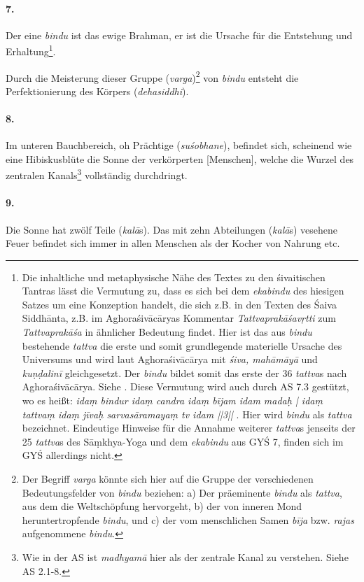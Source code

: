 \documentclass[a4paper,12pt]{article}
\begin{document}
\paragraph{7.} Der eine \textit{bindu} ist das ewige Brahman, er ist die Ursache für die Entstehung und Erhaltung\footnote{Die inhaltliche und metaphysische Nähe des Textes zu den śivaitischen Tantras lässt die Vermutung zu, dass es sich bei dem \textit{ekabindu} des hiesigen Satzes um eine Konzeption handelt, die sich z.B. in den Texten des Śaiva Siddhānta, z.B. im Aghoraśivācāryas Kommentar \textit{Tattvaprakāśavṛtti} zum \textit{Tattvaprakāśa} in ähnlicher Bedeutung findet. Hier ist das aus \textit{bindu} bestehende \textit{tattva} die erste und somit grundlegende materielle Ursache des Universums und wird laut Aghoraśivācārya mit \textit{śiva, mahāmāyā} und \textit{kuṇḍalinī} gleichgesetzt. Der \textit{bindu} bildet somit das erste der 36 \textit{tattva}s nach Aghoraśivācārya. Siehe \parencite[117, 177]{gengnagel1996}. Diese Vermutung wird auch durch AS 7.3 gestützt, wo es heißt: \textit{idaṃ bindur idaṃ candra idaṃ bījam idam madaḥ | idaṃ tattvaṃ idaṃ jīvaḥ sarvasāramayaṃ tv idam ||3||} \parencite[9]{asiddhi}. Hier wird \textit{bindu} als \textit{tattva} bezeichnet. Eindeutige Hinweise für die Annahme weiterer \textit{tattva}s jenseits der 25 \textit{tattva}s des Sāṃkhya-Yoga und dem \textit{ekabindu} aus GYŚ 7, finden sich im GYŚ allerdings nicht.}.

Durch die Meisterung dieser Gruppe (\textit{varga})\footnote{Der Begriff \textit{varga} könnte sich hier auf die Gruppe der verschiedenen Bedeutungsfelder von \textit{bindu} beziehen: a) Der präeminente \textit{bindu} als \textit{tattva}, aus dem die Weltschöpfung hervorgeht, b) der von inneren Mond heruntertropfende \textit{bindu}, und c) der vom menschlichen Samen \textit{bīja} bzw. \textit{rajas} aufgenommene \textit{bindu}.} von \textit{bindu} entsteht die Perfektionierung des Körpers (\textit{dehasiddhi}). 

\paragraph{8.} Im unteren Bauchbereich, oh Prächtige (\textit{suśobhane}), befindet sich, scheinend wie eine Hibiskusblüte die Sonne der verkörperten [Menschen], welche die Wurzel des zentralen Kanals\footnote{Wie in der AS ist \textit{madhyamā} hier als der zentrale Kanal zu verstehen. Siehe AS 2.1-8.} vollständig durchdringt. 

\paragraph{9.} Die Sonne hat zwölf Teile (\textit{kalā}s). Das mit zehn Abteilungen (\textit{kalā}s) vesehene Feuer befindet sich immer in allen Menschen als der Kocher von Nahrung etc. 
\end{document}
